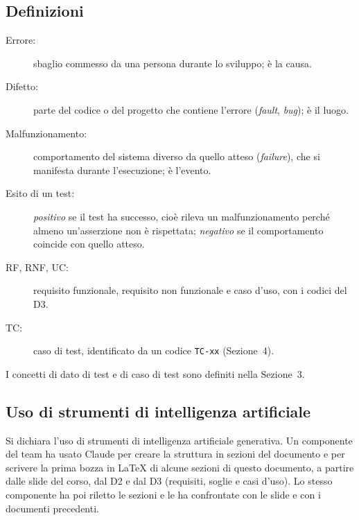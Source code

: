\subsection{Definizioni}

\begin{description}
    \item[Errore:] sbaglio commesso da una persona durante lo sviluppo; è la causa.
    \item[Difetto:] parte del codice o del progetto che contiene l'errore (\emph{fault}, \emph{bug}); è il luogo.
    \item[Malfunzionamento:] comportamento del sistema diverso da quello atteso (\emph{failure}), che si manifesta durante l'esecuzione; è l'evento.
    \item[Esito di un test:] \emph{positivo} se il test ha successo, cioè rileva un malfunzionamento perché almeno un'asserzione non è rispettata; \emph{negativo} se il comportamento coincide con quello atteso.
    \item[RF, RNF, UC:] requisito funzionale, requisito non funzionale e caso d'uso, con i codici del D3.
    \item[TC:] caso di test, identificato da un codice \texttt{TC-xx} (Sezione~4).
\end{description}

I concetti di dato di test e di caso di test sono definiti nella Sezione~3.

\subsection{Uso di strumenti di intelligenza artificiale}

 Si dichiara l'uso di strumenti di intelligenza artificiale generativa. Un componente del team ha usato Claude per creare la struttura in sezioni del documento e per scrivere la prima bozza in \LaTeX{} di alcune sezioni di questo documento, a partire dalle slide del corso, dal D2 e dal D3 (requisiti, soglie e casi d'uso). Lo stesso componente ha poi riletto le sezioni e le ha confrontate con le slide e con i documenti precedenti.

